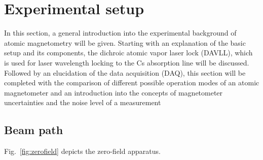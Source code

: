 \chapter{Experimental setup}
\small

In this section, a general introduction into the experimental
background of atomic magnetometry will be given. Starting with an
explanation of the basic setup and its components, the dichroic atomic
vapor laser lock (DAVLL), which is used for laser wavelength locking
to the Cs absorption line will be discussed. Followed by an
elucidation of the data acquisition (DAQ), this section will be
completed with the comparison of different possible operation modes of
an atomic magnetometer and an introduction into the concepts of
magnetometer uncertainties and the noise level of a measurement

\section{Beam path}

Fig.~\ref{fig:zerofield} depicts the zero-field apparatus.

